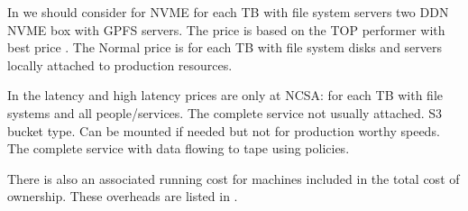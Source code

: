 

In  we should consider for NVME for each TB with file system servers two DDN NVME box with GPFS servers.
The price is based on the TOP performer with best price .
The Normal price is for each TB with file system disks and servers locally attached to production resources.

In the latency and high latency prices are only at NCSA: for each TB with file systems and all people/services.
The complete service not usually attached.   S3 bucket type.
Can be mounted if needed but not for production worthy speeds.
The complete service with data flowing to tape using policies.



There is also an associated running cost for machines included in the total cost of ownership.
These overheads are listed in .




